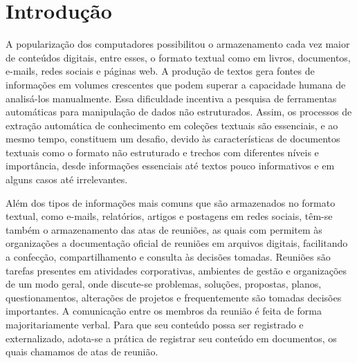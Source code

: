 \chapter{Introdução}\label{chap:introducao}


A popularização dos computadores possibilitou o armazenamento cada vez maior de conteúdos digitais, entre esses, o formato textual como em livros, documentos, e-mails, redes sociais e páginas web. A produção de textos gera fontes de informações em volumes crescentes que podem superar a capacidade humana de analisá-los manualmente. Essa dificuldade incentiva a pesquisa de ferramentas automáticas para manipulação de dados não estruturados. Assim, os processos de extração automática de conhecimento em coleções textuais são essenciais, e ao mesmo tempo, constituem um desafio, devido às características de documentos textuais como o formato não estruturado e trechos com diferentes níveis e importância, desde informações essenciais até textos pouco informativos e em alguns casos até irrelevantes. 

Além dos tipos de informações mais comuns que são armazenados no formato textual, como e-mails, relatórios, artigos e postagens em redes sociais, têm-se também o armazenamento das atas de reuniões, as quais com permitem às organizações a documentação oficial de reuniões em arquivos digitais, facilitando a confecção, compartilhamento e consulta às decisões tomadas.
% 
% 
% 
% 
Reuniões são tarefas presentes em atividades corporativas, ambientes de gestão e organizações de um modo geral, onde discute-se problemas, soluções, propostas, planos, questionamentos, alterações de projetos e frequentemente são tomadas decisões importantes. A comunicação entre os membros da reunião é feita de forma majoritariamente verbal. Para que seu conteúdo possa ser registrado e externalizado, adota-se a prática de registrar seu conteúdo em documentos, os quais chamamos de atas de reunião. 


